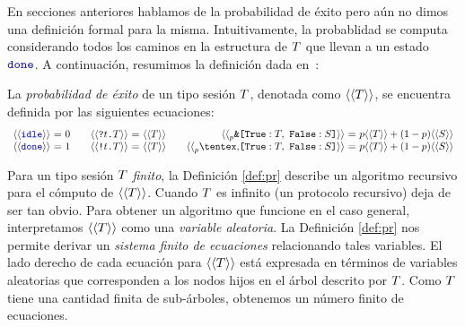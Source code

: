 \label{cap:prob_exito}
En secciones anteriores hablamos de la probabilidad de éxito pero aún no dimos
una definición formal para la misma. Intuitivamente, la probablidad se computa
considerando todos los caminos en la estructura de $T$ que llevan a
un estado $\Done$. A continuación, resumimos la definición dada
en~\cite{DBLP:conf/concur/InversoMPTT20}:

\begin{definition}
  \label{def:pr}
	La \emph{probabilidad de éxito} de un tipo sesión $T$,
	denotada como $\langle\langle T\rangle\rangle$, se encuentra definida por
	las siguientes ecuaciones:
  \[
    \begin{array}{r@{~}c@{~}l}
      \psfun\Idle & = & 0 \\
      \psfun\Done & = & 1 \\
    \end{array}
    \quad
    \begin{array}{r@{~}c@{~}l}
      \psfun{\In\Type\SessionType} & = & \psfun\SessionType \\
      \psfun{\Out\Type\SessionType} & = & \psfun\SessionType \\
    \end{array}
    \quad
    \begin{array}{r@{~}c@{~}l}
      \psfun{\BinaryPBranch\SessionTypeT\SessionTypeS} & = & p\psfun\SessionTypeT + (1-p)\psfun\SessionTypeS \\
      \psfun{\BinaryPChoice\SessionTypeT\SessionTypeS} & = & p\psfun\SessionTypeT + (1-p)\psfun\SessionTypeS \\
    \end{array}
  \]
\end{definition}

Para un tipo sesión $T$ \emph{finito}, la Definición \ref{def:pr}
describe un algoritmo recursivo para el cómputo de $\langle\langle T\rangle\rangle$. Cuando
$T$ es infinito (un protocolo recursivo) deja de ser tan obvio. Para
obtener un algoritmo que funcione en el caso general, interpretamos
$\langle\langle T\rangle\rangle$ como una \emph{variable aleatoria}. La Definición
\ref{def:pr} nos permite derivar un \emph{sistema finito de ecuaciones}
relacionando tales variables. El lado derecho de cada ecuación para
$\langle\langle T\rangle\rangle$ está expresada en términos de variables aleatorias que
corresponden a los nodos hijos en el árbol descrito por $T$. Como
$T$ tiene una cantidad finita de sub-árboles, obtenemos un número
finito de ecuaciones.


